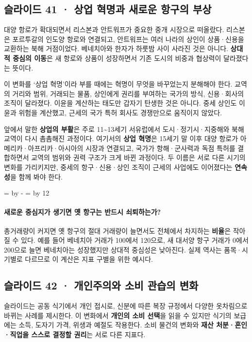 \documentclass[10pt,a4paper]{article}
\newcommand{\ReserveQuestionSpace}{%
  \par\begingroup
  \dimen0=\pagegoal \advance\dimen0 by -\pagetotal
  \dimen2=\baselineskip \multiply\dimen2 by 12
  \ifdim\dimen0<\dimen2 \newpage\fi
  \endgroup}
\begin{document}
\subsection{슬라이드 41 · 상업 혁명과 새로운 항구의 부상}
대양 항로가 확대되면서 리스본과 안트워프가 중요한 중개 시장으로 떠올랐다. 리스본은 포르투갈의 인도양 항로와 연결되고, 안트워프는 여러 나라의 상인이 상품·신용을 교환하는 북해 거점이었다. 베네치아와 한자가 하룻밤 사이 사라진 것은 아니다. \textbf{상대적 중심의 이동}은 새 항로와 상품이 성장하면서 기존 도시의 비중과 협상력이 달라졌다는 뜻이다.\par

이 변화를 ‘상업 혁명’이라 부를 때에는 혁명이 무엇을 바꾸었는지 분해해야 한다. 교역의 거리와 범위, 거래되는 물품, 상인에게 권리를 부여하는 국가의 방식, 신용·회사의 조직이 달라졌다. 이윤을 계산하는 태도만 갑자기 탄생한 것은 아니다. 중세 상인도 이윤과 위험을 계산했고, 근세의 국가 특허 회사도 경쟁만으로 움직이지 않았다.\par

앞에서 말한 \textbf{상업의 부활}은 주로 11\textasciitilde{}13세기 서유럽에서 도시·정기시·지중해와 북해 교역이 다시 촘촘해진 과정이다. 여기서의 \textbf{상업 혁명}은 15세기 말 이후 대양 항로가 아메리카·아프리카·아시아의 시장과 연결되고, 국가가 항해·군사력과 독점 특허를 결합하면서 교역의 범위와 권력 구조가 크게 바뀐 과정이다. 두 이름은 서로 다른 시기의 변화를 가리키지만, 중세의 항구·신용·상인 조직이 근세의 사업에도 이어졌다는 \textbf{연속성}을 함께 봐야 한다.\par

\ReserveQuestionSpace
\paragraph{새로운 중심지가 생기면 옛 항구는 반드시 쇠퇴하는가?}
총거래량이 커지면 옛 항구의 절대 거래량이 늘면서도 전체에서 차지하는 \textbf{비율}은 작아질 수 있다. 예를 들어 베네치아 거래가 100에서 120으로, 새 대서양 항구 거래가 0에서 200으로 늘면 베네치아는 성장했지만 상대적 중심성은 낮아진다. 실제 역사는 품목·시기별로 다르므로 이 계산은 지표 구별을 위한 예시다.\par

\subsection{슬라이드 42 · 개인주의와 소비 관습의 변화}
슬라이드는 공동 식기에서 개인 접시로, 신분에 따른 복장 규정에서 다양한 옷차림으로 바뀌는 사례를 제시한다. 이 변화에서 \textbf{개인의 소비 선택}을 읽을 수 있지만 식기의 보급에는 소득, 도자기 가격, 위생과 예절도 작용한다. 소비 물건의 변화와 \textbf{재산 처분·혼인·직업을 스스로 결정할 권리}는 서로 다른 지표다.\par
\end{document}

